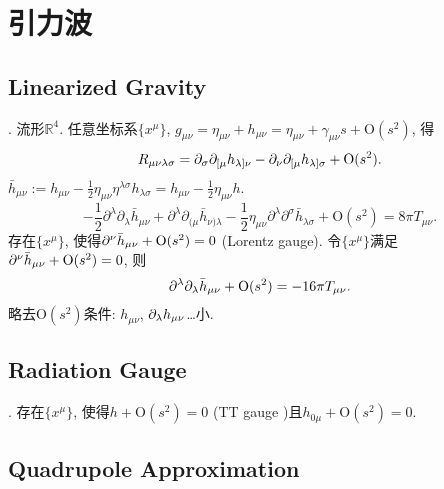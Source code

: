 \chapter{引力波}

\section{Linearized Gravity}

\cite{Wald1984}. 流形$\mathbb{R}^{4}$. 任意坐标系$\{x^{\mu}\}$, $g_{\mu\nu}=\eta_{\mu\nu}+h_{\mu\nu}=\eta_{\mu\nu}+\gamma_{\mu\nu}s+\text{O}(s^2)$, 得
\begin{equation}
    R_{\mu\nu\lambda\sigma}=\partial_\sigma\partial_{[\mu}h_{\lambda]\nu}-\partial_\nu\partial_{[\mu}h_{\lambda]\sigma}+\text{O}(s^2).
\end{equation}
$\bar{h}_{\mu\nu}:=h_{\mu\nu}-\frac{1}{2}\eta_{\mu\nu}\eta^{\lambda\sigma}h_{\lambda\sigma}=h_{\mu\nu}-\frac{1}{2}\eta_{\mu\nu}h$.
\begin{equation}
    -\frac{1}{2} \partial^{\lambda} \partial_{\lambda} \bar{h}_{\mu \nu}+\partial^{\lambda} \partial_{(\mu} \bar{h}_{\nu) \lambda}-\frac{1}{2} \eta_{\mu \nu} \partial^{\lambda} \partial^{\sigma} \bar{h}_{\lambda \sigma}+\text{O}(s^2)=8 \pi T_{\mu \nu}.
\end{equation}
存在$\{x^{\mu}\}$, 使得$\partial^{\nu}\bar{h}_{\mu\nu}+\text{O}(s^2)=0$ (Lorentz gauge). 
令$\{x^{\mu}\}$满足$\partial^{\nu}\bar{h}_{\mu\nu}+\text{O}(s^2)=0$, 则
\begin{equation}
    \partial^{\lambda}\partial_{\lambda}\bar{h}_{\mu\nu}+\text{O}(s^2)=-16\pi T_{\mu \nu}.\label{lin_gravity}
\end{equation}
略去$\text{O}(s^2)$条件: $h_{\mu\nu}$, $\partial_\lambda h_{\mu\nu}$\dots{}小.

\section{Radiation Gauge}

\cite{Wald1984}. 存在$\{x^{\mu}\}$, 使得$h+\text{O}(s^2)=0$ (TT gauge \cite{Wang2020})且$h_{0\mu}+\text{O}(s^2)=0$. 

\section{Quadrupole Approximation}

